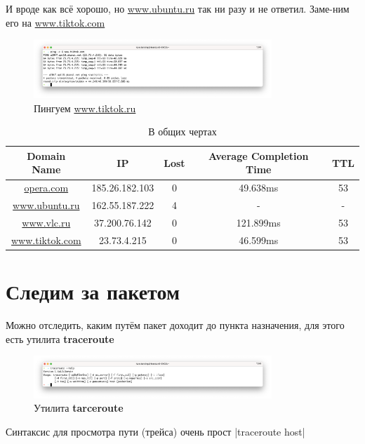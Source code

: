 \documentclass[a4paper]{article}
\begin{document}
  И вроде как всё хорошо, но \href{www.ubuntu.ru}{www.ubuntu.ru} так ни разу и не ответил. Заме-ним его на \href{www.tiktok.com}{www.tiktok.com}
  \begin{figure}[H]
    \centering
    \includegraphics[width=0.8\textwidth]{s27}
    \caption{Пингуем \href{www.tiktok.ru}{www.tiktok.ru}}
  \end{figure}

  \begin{table}[H]
    \centering
    \begin{tabular}{|c|c|c|c|c|}
      \hline
      Domain Name & IP & Lost & Average Completion Time & TTL \\
      \hline
      \href{opera.com}{opera.com} & 185.26.182.103 & 0 & 49.638ms & 53 \\
      \hline
      \href{www.ubuntu.ru}{www.ubuntu.ru} & 162.55.187.222 & 4 & - & - \\
      \hline
      \href{www.vlc.ru}{www.vlc.ru} & 37.200.76.142 & 0 & 121.899ms & 53 \\
      \hline
      \href{www.tiktok.com}{www.tiktok.com} & 23.73.4.215 & 0 & 46.599ms & 53 \\
      \hline
    \end{tabular}
    \caption{В общих чертах}
  \end{table}

  \newpage
  \section{Следим за пакетом}

  Можно отследить, каким путём пакет доходит до пункта назначения, для этого есть утилита \textbf{traceroute}
  \begin{figure}[H]
    \centering
    \includegraphics[width=0.8\textwidth]{s28}
    \caption{Утилита \textbf{tarceroute}}
  \end{figure}

  Синтаксис для просмотра пути (трейса) очень прост
  |traceroute host|
  
\end{document}
